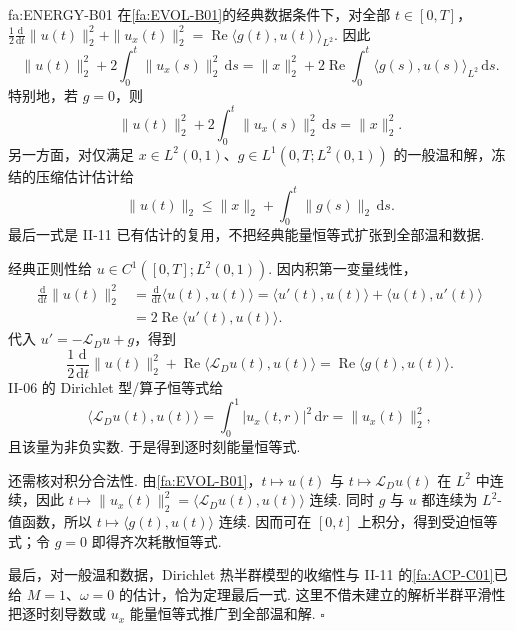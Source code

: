 \begin{FATheorem}{fa:ENERGY-B01}
在\autoref{fa:EVOL-B01}的经典数据条件下，对全部 \(\displaystyle t\in[0,T]\)， \(\displaystyle \frac12\frac{\mathrm{d}}{\mathrm{d}t}\|u(t)\|_2^2 + \|u_x(t)\|_2^2 = \operatorname{Re}\langle g(t),u(t)\rangle_{L^2}.\)
因此
\[
\|u(t)\|_2^2
+
2\int_0^t\|u_x(s)\|_2^2\,\mathrm{d}s
=
\|x\|_2^2
+
2\operatorname{Re}
\int_0^t
\langle g(s),u(s)\rangle_{L^2}
\,\mathrm{d}s.
\]
特别地，若 \(\displaystyle g=0\)，则
\[
\|u(t)\|_2^2
+
2\int_0^t\|u_x(s)\|_2^2\,\mathrm{d}s
=
\|x\|_2^2.
\]
另一方面，对仅满足 \(\displaystyle x\in L^2(0,1)\)、\(\displaystyle g\in L^1(0,T;L^2(0,1))\) 的一般温和解，冻结的压缩估计估计给
\[
\|u(t)\|_2
\leqslant
\|x\|_2
+
\int_0^t\|g(s)\|_2\,\mathrm{d}s.
\]
最后一式是 II-11 已有估计的复用，不把经典能量恒等式扩张到全部温和数据.
\end{FATheorem}

\begin{FAProof}
经典正则性给 \(\displaystyle u\in C^1([0,T];L^2(0,1))\). 因内积第一变量线性，
\[
\begin{aligned}
\displaystyle \frac{\mathrm{d}}{\mathrm{d}t}\|u(t)\|_2^2
&=
\displaystyle \frac{\mathrm{d}}{\mathrm{d}t}\langle u(t),u(t)\rangle
=
\langle u'(t),u(t)\rangle+\langle u(t),u'(t)\rangle\\[6pt]
&=
2\operatorname{Re}\langle u'(t),u(t)\rangle.
\end{aligned}
\]
代入 \(\displaystyle u'=-\mathcal L_Du+g\)，得到
\[
\frac12\frac{\mathrm{d}}{\mathrm{d}t}\|u(t)\|_2^2
+
\operatorname{Re}\langle\mathcal L_Du(t),u(t)\rangle
=
\operatorname{Re}\langle g(t),u(t)\rangle.
\]
II-06 的 Dirichlet 型/算子恒等式给
\[
\langle\mathcal L_Du(t),u(t)\rangle
=
\int_0^1|u_x(t,r)|^2\,\mathrm{d}r
=
\|u_x(t)\|_2^2,
\]
且该量为非负实数. 于是得到逐时刻能量恒等式.

还需核对积分合法性. 由\autoref{fa:EVOL-B01}，\(\displaystyle t\mapsto u(t)\) 与 \(\displaystyle t\mapsto\mathcal L_Du(t)\) 在 \(\displaystyle L^2\) 中连续，因此 \(\displaystyle t\mapsto \|u_x(t)\|_2^2 = \langle\mathcal L_Du(t),u(t)\rangle\)
连续. 同时 \(\displaystyle g\) 与 \(\displaystyle u\) 都连续为 \(\displaystyle L^2\)-值函数，所以 \(\displaystyle t\mapsto\langle g(t),u(t)\rangle\) 连续. 因而可在 \(\displaystyle[0,t]\) 上积分，得到受迫恒等式；令 \(\displaystyle g=0\) 即得齐次耗散恒等式.

最后，对一般温和数据，Dirichlet 热半群模型的收缩性与 II-11 的\autoref{fa:ACP-C01}已给 \(\displaystyle M=1\)、\(\displaystyle\omega=0\) 的估计，恰为定理最后一式. 这里不借未建立的解析半群平滑性把逐时刻导数或 \(\displaystyle u_x\) 能量恒等式推广到全部温和解.
\hfill\(\square\)
\end{FAProof}

